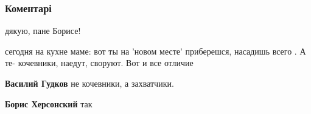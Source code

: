  
 
 
 
 
\subsubsection{Коментарі}
\label{sec:08_07_2021.fb.hersonskij_boris.1.odin_narod_putin.cmt}

\begin{itemize}
 
дякую, пане Борисе!

 
сегодня на кухне маме: вот ты на 'новом месте' приберешся, насадишь всего . А
те- кочевники, наедут, своруют. Вот и все отличие

\begin{itemize}
 
\textbf{Василий Гудков} не кочевники, а захватчики.

 
\textbf{Борис Херсонский} так

 


\end{itemize}
\end{itemize}
